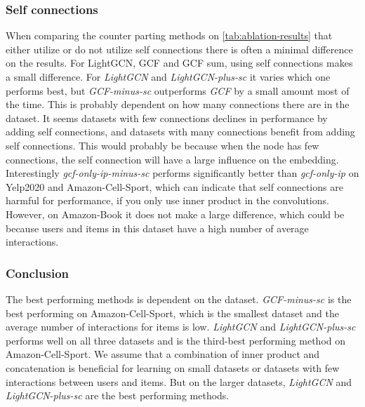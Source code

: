 \subsubsection{Self connections}
When comparing the counter parting methods on \autoref{tab:ablation-results} that either utilize or do not utilize self connections there is often a minimal difference on the results.
For LightGCN, GCF and GCF sum, using self connections makes a small difference.
For \textit{LightGCN} and \textit{LightGCN-plus-sc} it varies which one performs best, but \textit{GCF-minus-sc} outperforms \textit{GCF} by a small amount most of the time.
This is probably dependent on how many connections there are in the dataset.
It seems datasets with few connections declines in performance by adding self connections, and datasets with many connections benefit from adding self connections.
This would probably be because when the node has few connections, the self connection will have a large influence on the embedding.
Interestingly \textit{gcf-only-ip-minus-sc} performs significantly better than \textit{gcf-only-ip} on Yelp2020 and Amazon-Cell-Sport, which can indicate that self connections are harmful for performance, if you only use inner product in the convolutions.
However, on Amazon-Book it does not make a large difference, which could be because users and items in this dataset have a high number of average interactions.

\subsubsection{Conclusion}
The best performing methods is dependent on the dataset.
\textit{GCF-minus-sc} is the best performing on Amazon-Cell-Sport, which is the smallest dataset and the average number of interactions for items is low.
\textit{LightGCN} and \textit{LightGCN-plus-sc} performs well on all three datasets and is the third-best performing method on Amazon-Cell-Sport.
We assume that a combination of inner product and concatenation is beneficial for learning on small datasets or datasets with few interactions between users and items.
But on the larger datasets, \textit{LightGCN} and \textit{LightGCN-plus-sc} are the best performing methods.
